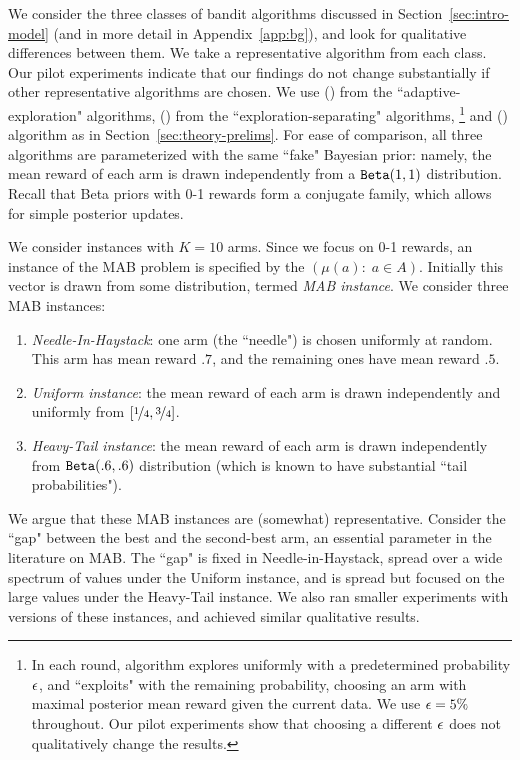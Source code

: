 \documentclass[../competing_bandits.tex]{subfiles}
\begin{document}
 We consider the three classes of bandit algorithms discussed in Section~\ref{sec:intro-model} (and in more detail in Appendix~\ref{app:bg}), and look for qualitative differences between them. We take a representative algorithm from each class. Our pilot experiments indicate that our findings do not change substantially if other representative algorithms are chosen.
We use \Thompson (\TS) from the ``adaptive-exploration" algorithms, \DynamicEpsGreedy (\DEG) from the ``exploration-separating" algorithms,%
\footnote{In each round, \DynamicEpsGreedy algorithm explores uniformly with a predetermined probability $\epsilon$, and ``exploits" with the remaining probability, choosing an arm with maximal posterior mean reward given the current data. We use $\epsilon=5\%$ throughout. Our pilot experiments show that choosing a different $\epsilon$ does not qualitatively change the results.}  and \DynGreedy (\DG) algorithm  as in Section~\ref{sec:theory-prelims}. For ease of comparison, all three algorithms are parameterized with the same ``fake" Bayesian prior: namely, the mean reward of each arm is drawn independently from a $\mathtt{Beta}(1,1)$ distribution. Recall that Beta priors with 0-1 rewards form a conjugate family, which allows for simple posterior updates.


We consider instances with $K=10$ arms. Since we focus on 0-1 rewards, an instance of the MAB problem is specified by the \emph{\MRV} $(\mu(a):\; a\in A)$. Initially this vector is drawn from some distribution, termed \emph{MAB instance}. We consider three MAB instances:
\begin{enumerate}
\item \emph{Needle-In-Haystack}: one arm (the ``needle") is chosen uniformly at random. This arm has mean reward $.7$, and the remaining ones have mean reward $.5$.

\item \emph{Uniform instance}: the mean reward of each arm is drawn independently and uniformly from $[\nicefrac{1}{4}, \nicefrac{3}{4}]$.
\item \emph{Heavy-Tail instance}: the mean reward of each arm is drawn independently from $\mathtt{Beta}(.6,.6)$ distribution (which is known to have substantial ``tail probabilities").
\end{enumerate}
We argue that these MAB instances are (somewhat) representative. Consider the ``gap" between the best and the second-best arm, an essential parameter in the literature on MAB. The ``gap" is fixed in Needle-in-Haystack, spread over a wide spectrum of values under the Uniform instance, and is spread but  focused on the large values under the Heavy-Tail instance. We also ran smaller experiments with versions of these instances, and achieved similar qualitative results.
\end{document}
